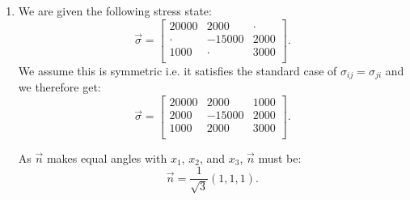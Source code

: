 \begin{derivation}
  \begin{enumerate}[label=(\alph*)]
    \item We are given the following stress state:
      \begin{equation*}
        \Vec{\sigma} = \begin{bmatrix}
          \num{20000}  & \num{2000}  & \cdot \\
        \cdot  & \num{-15000}  & \num{2000} \\
        \num{1000}  & \cdot  & \num{3000} \\
        \end{bmatrix}
      .\end{equation*}
      We assume this is symmetric i.e. it satisfies the standard case of $\sigma_{ij} = \sigma_{ji}$ and we therefore get:
      \begin{equation*}
        \Vec{\sigma} = \begin{bmatrix}
          \num{20000}  & \num{2000}  & \num{1000} \\
        \num{2000}  & \num{-15000}  & \num{2000} \\
        \num{1000}  & \num{2000}  & \num{3000} \\
        \end{bmatrix}
      .\end{equation*}
      
      As $\Vec{n}$ makes equal angles with $x_1$, $x_2$, and $x_3$, $\Vec{n}$ must be:
      \begin{equation*}
        \Vec{n} = \frac{1}{\sqrt{3}} (1,1,1)
      .\end{equation*}
      

\end{enumerate}
\end{derivation}
